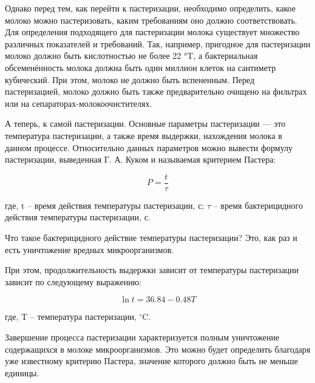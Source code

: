 {  \par \redline Однако перед тем, как перейти к пастеризации, необходимо определить, какое молоко можно пастеризовать, каким требованиям оно должно соответствовать. Для определения подходящего для пастеризации молока существует множество различных показателей и требований. Так, например, пригодное для пастеризации молоко должно быть кислотностью не более 22 °T, а бактериальная обсеменённость молока должна быть один миллион клеток на сантиметр кубический. При этом, молоко не должно быть вспененным. Перед пастеризацией, молоко должно быть также предварительно очищено на фильтрах или на сепараторах-молокоочистителях. 

  \par \redline А теперь, к самой пастеризации. Основные параметры пастеризации — это температура пастеризации, а также время выдержки, нахождения молока в данном процессе. Относительно данных параметров можно вывести формулу пастеризации, выведенная Г. А. Куком и называемая критерием Пастера:
  
  \par

  \[P=\frac{t}{\tau}\]

  где, t {--} время действия температуры пастеризации, с; $\tau$ {--} время бактерицидного действия температуры пастеризации, с.

  \par \redline Что такое бактерицидного действие температуры пастеризации? Это, как раз и есть уничтожение вредных микроорганизмов. 

  \par \redline При этом, продолжительность выдержки зависит от температуры пастеризации зависит по следующему выражению: 
  \par 

  \[\ln{t} = 36.84 - 0.48T\]

  где, T {--} температура пастеризации, $^{\circ}$C.

  \par \redline Завершение процесса пастеризации характеризуется полным уничтожение содержащихся в молоке микроорганизмов. Это можно будет определить благодаря уже известному критерию Пастера, значение которого должно быть не меньше единицы. 
  \par \redline %
}

